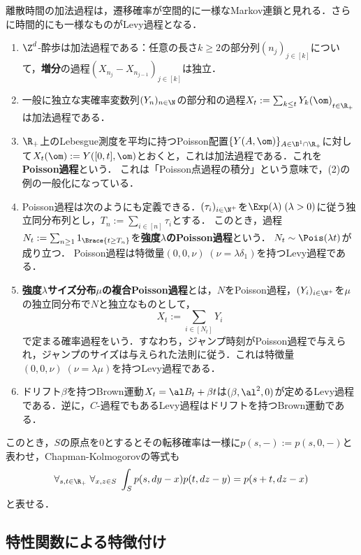 \documentclass[uplatex,dvipdfmx]{jsreport}
\begin{document}
\begin{example}
    離散時間の加法過程は，遷移確率が空間的に一様なMarkov連鎖と見れる．さらに時間的にも一様なものがLevy過程となる．
    \begin{enumerate}
        \item $\Z^d$-酔歩は加法過程である：任意の長さ$k\ge2$の部分列$(n_j)_{j\in[k]}$について，\textbf{増分}の過程$(X_{n_j}-X_{n_{j-1}})_{j\in[k]}$は独立．
        \item 一般に独立な実確率変数列$(Y_n)_{n\in\N}$の部分和の過程${X_t:=\sum_{k\le t}Y_k(\om)}_{t\in\R_+}$は加法過程である．
        \item $\R_+$上のLebesgue測度を平均に持つPoisson配置$\{Y(A,\om)\}_{A\in\B^1\cap\R_+}$に対して$X_t(\om):=Y([0,t],\om)$とおくと，これは加法過程である．これを\textbf{Poisson過程}という．
        これは「Poisson点過程の積分」という意味で，(2)の例の一般化になっている．
        \item Poisson過程は次のようにも定義できる．$(\tau_i)_{i\in\N^+}$を$\Exp(\lambda)\;(\lambda>0)$に従う独立同分布列とし，$T_n:=\sum_{i\in[n]}\tau_i$とする．
        このとき，過程$N_t:=\sum_{n\ge1}1_{\Brace{t\ge T_n}}$を\textbf{強度$\lambda$のPoisson過程}という．
        $N_t\sim\Pois(\lambda t)$が成り立つ．
        Poisson過程は特徴量$(0,0,\nu)\;(\nu=\lambda\delta_1)$を持つLevy過程である．
        \item \textbf{強度$\lambda$サイズ分布$\mu$の複合Poisson過程}とは，$N$をPoisson過程，$(Y_i)_{i\in\N^+}$を$\mu$の独立同分布で$N$と独立なものとして，
        \[X_t:=\sum_{i\in[N_t]}Y_i\]
        で定まる確率過程をいう．すなわち，ジャンプ時刻がPoisson過程で与えられ，ジャンプのサイズは与えられた法則に従う．これは特徴量$(0,0,\nu)\;(\nu=\lambda\mu)$を持つLevy過程である．
        \item ドリフト$\beta$を持つBrown運動$X_t=\al B_t+\beta t$は$(\beta,\al^2,0)$が定めるLevy過程である．逆に，$C$-過程でもあるLevy過程はドリフトを持つBrown運動である．
    \end{enumerate}
\end{example}

\begin{remark}
    このとき，$S$の原点を$0$とするとその転移確率は一様に$p(s,-):=p(s,0,-)$と表わせ，Chapman-Kolmogorovの等式も
    \[\forall_{s,t\in\R_+}\;\forall_{x,z\in S}\;\int_Sp(s,dy-x)p(t,dz-y)=p(s+t,dz-x)\]
    と表せる．
\end{remark}

\subsection{特性関数による特徴付け}
\end{document}

